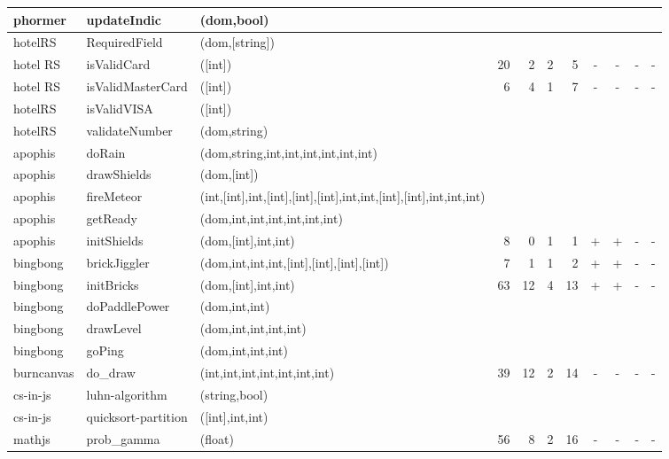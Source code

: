 \documentclass[sigconf]{acmart}
\begin{document}
\begin{table*}
\begin{tabular}{l|l|l|r|r|r|r|c|c|c|c}
    phormer    & updateIndic & (dom,bool)                                 &    &    &   &    &   &   &   & \\
    \midrule
    hotelRS    & RequiredField & (dom,[string])                           &    &    &   &    &   &   &   & \\
    hotel RS   & isValidCard & ([int])                                    & 20 & 2  & 2 & 5  & - & - & - & - \\
    hotel RS   & isValidMasterCard & ([int])                              & 6  & 4  & 1 & 7  & - & - & - & - \\
    hotelRS    & isValidVISA & ([int])                                    &    &    &   &    &   &   &   & \\
    hotelRS    & validateNumber & (dom,string)                            &    &    &   &    &   &   &   & \\
    \midrule
    apophis    & doRain & (dom,string,int,int,int,int,int,int)            &    &    &   &    &   &   &   & \\
    apophis    & drawShields & (dom,[int])                                &    &    &   &    &   &   &   & \\
    apophis    & fireMeteor & (int,[int],int,[int],[int],[int],int,int,[int],[int],int,int,int) &    &    &   &    &   &   &   & \\
    apophis    & getReady & (dom,int,int,int,int,int,int)                 &    &    &   &    &   &   &   & \\
    apophis    & initShields & (dom,[int],int,int)                        & 8  & 0  & 1 & 1  & + & + & - & -\\
    \midrule
    bingbong   & brickJiggler & (dom,int,int,int,[int],[int],[int],[int]) & 7  & 1  & 1 & 2  & + & + & - & - \\
    bingbong   & initBricks & (dom,[int],int,int)                         & 63 & 12 & 4 & 13 & + & + & - & - \\
    bingbong   & doPaddlePower & (dom,int,int)                            &    &    &   &    &   &   &   & \\
    bingbong   & drawLevel & (dom,int,int,int,int)                        &    &    &   &    &   &   &   & \\
    bingbong   & goPing & (dom,int,int,int)                               &    &    &   &    &   &   &   & \\
    \midrule
    burncanvas & do\_draw & (int,int,int,int,int,int,int)                 & 39 & 12 & 2 & 14 & - & - & - & - \\
    \midrule
    cs-in-js   & luhn-algorithm & (string,bool)                           &    &    &   &    &   &   &   & \\
    cs-in-js   & quicksort-partition & ([int],int,int)                    &    &    &   &    &   &   &   & \\ 
    \midrule
    mathjs     & prob\_gamma & (float)                                    & 56 & 8  & 2 & 16 & - & - & - & - \\
    \bottomrule
  \end{tabular}
\end{table*}
\end{document}
